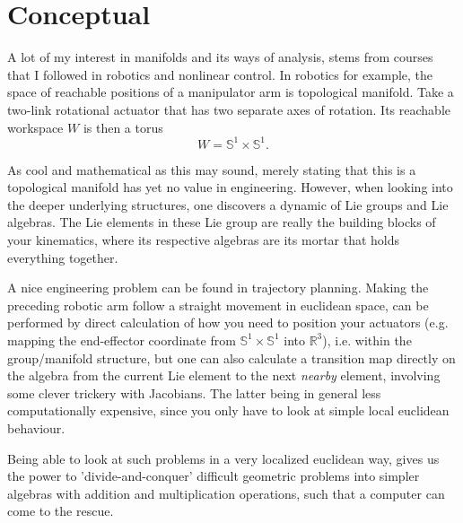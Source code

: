 \section{Conceptual}
A lot of my interest in manifolds and its ways of analysis, stems from courses that I followed in robotics and nonlinear control. In robotics for example, the space of reachable positions of a manipulator arm is topological manifold. Take a two-link rotational actuator that has two separate axes of rotation. Its reachable workspace $W$ is then a torus 
\[
W = \mathbb{S}^1 \times  \mathbb{S}^1.
\]

As cool and mathematical as this may sound, merely stating that this is a topological manifold has yet no value in engineering. However, when looking into the deeper underlying structures, one discovers a dynamic of Lie groups and Lie algebras. The Lie elements in these Lie group are really the building blocks of your kinematics, where its respective algebras are its mortar that holds everything together. 

A nice engineering problem can be found in trajectory planning. Making the preceding robotic arm follow a straight movement in euclidean space, can be performed by direct calculation of how you need to position your actuators (e.g. mapping the end-effector coordinate from $ \mathbb{S}^1 \times  \mathbb{S}^1$ into $\mathbb{R}^3$), i.e.  within the group/manifold structure, but one can also calculate a transition map directly on the algebra from the current Lie element to the next \textit{nearby} element, involving some clever trickery with Jacobians. The latter being in general less computationally expensive, since you only have to look at simple local euclidean behaviour.

Being able to look at such problems in a very localized euclidean way, gives us the power to 'divide-and-conquer' difficult geometric problems into simpler algebras with addition and multiplication operations, such that a computer can come to the rescue.
